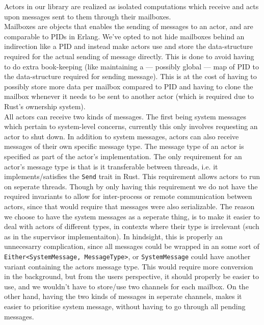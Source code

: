 \documentclass[a4paper]{article}
\begin{document}
\noindent
Actors in our library are realized as isolated computations %
which receive and acts upon messages sent to them through their mailboxes.\\

\noindent
Mailboxes are objects that enables the sending of messages to an actor, and are
comparable to PIDs in Erlang. We've opted to not hide mailboxes behind an
indirection like a PID and instead make actors use and store the data-structure
required for the actual sending of message directly. This is done to avoid
having to do extra book-keeping (like maintaining a --- possibly global --- map
of PID to the data-structure required for sending message). This is at the cost
of having to possibly store more data per mailbox compared to PID and having to
clone the mailbox whenever it needs to be sent to another actor (which is
required due to Rust's ownership system).\\

\noindent
All actors can receive two kinds of messages. The first being system messages
which pertain to system-level concerns, currently this only involves requesting
an actor to shut down. In addition to system messages, actors can also
receive messages of their own specific message type. The message type of an
actor is specified as part of the actor's implementation. The only requirement
for an actor's message type is that is it transferable between threads, i.e. it
implements/satisfies the \texttt{Send} trait in Rust. This requirement allows
actors to run on seperate threads. Though by only having this requirement we do
not have the required invariants to allow for inter-process or remote
communication between actors, since that would require that messages were also
serializable. The reason we choose to have the system messages as a seperate
thing, is to make it easier to deal with actors of different types, in contexts
where their type is irrelevant (such as in the supervisor implementaiton). In
hindsight, this is properly an unnecesarry complication, since all messages
could be wrapped in an some sort of \texttt{Either<SystemMessage, MessageType>},
or \texttt{SystemMessage} could have another variant containing the actors
message type. This would require more conversion in the background, but from the
users perspective, it should properly be easier to use, and we wouldn't have to
store/use two channels for each mailbox. On the other hand, having the two kinds
of messages in seperate channels, makes it easier to prioritise system message,
without having to go through all pending messages.\\
\end{document}
